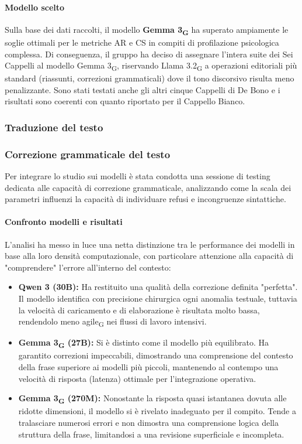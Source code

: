 \documentclass[11pt,a4paper]{article}
\newcommand{\gls}[1]{#1\textsubscript{G}}
\begin{document}
\paragraph{Modello scelto}
Sulla base dei dati raccolti, il modello \textbf{\gls{Gemma 3}} ha superato ampiamente le soglie ottimali per le metriche AR e CS in compiti di profilazione psicologica complessa. Di conseguenza, il gruppo ha deciso di assegnare l'intera suite dei Sei Cappelli al modello \gls{Gemma 3}, riservando \gls{Llama 3.2} a operazioni editoriali più standard (riassunti, correzioni grammaticali) dove il tono discorsivo risulta meno penalizzante. Sono stati testati anche gli altri cinque Cappelli di De Bono e i risultati sono coerenti con quanto riportato per il Cappello Bianco.

\subsubsection{Traduzione del testo}
\subsubsection{Correzione grammaticale del testo}
 Per integrare lo studio sui modelli è stata condotta una sessione di testing dedicata alle capacità di correzione grammaticale, analizzando come la scala dei parametri influenzi la capacità di individuare refusi e incongruenze sintattiche.
 \paragraph{Confronto modelli e risultati}
 L'analisi ha messo in luce una netta distinzione tra le performance dei modelli in base alla loro densità computazionale, con particolare attenzione alla capacità di "comprendere" l'errore all'interno del contesto:
 
 \begin{itemize}
    \item \textbf{Qwen 3 (30B):} Ha restituito una qualità della correzione definita "perfetta". Il modello identifica con precisione chirurgica ogni anomalia testuale, tuttavia la velocità di caricamento e di elaborazione è risultata molto bassa, rendendolo meno \gls{agile} nei flussi di lavoro intensivi.
    
    \item \textbf{\gls{Gemma 3} (27B):} Si è distinto come il modello più equilibrato. Ha garantito correzioni impeccabili, dimostrando una comprensione del contesto della frase superiore ai modelli più piccoli, mantenendo al contempo una velocità di risposta (latenza) ottimale per l'integrazione operativa.
    
    \item \textbf{\gls{Gemma 3} (270M):} Nonostante la risposta quasi istantanea dovuta alle ridotte dimensioni, il modello si è rivelato inadeguato per il compito. Tende a tralasciare numerosi errori e non dimostra una comprensione logica della struttura della frase, limitandosi a una revisione superficiale e incompleta.
\end{itemize}
\end{document}

